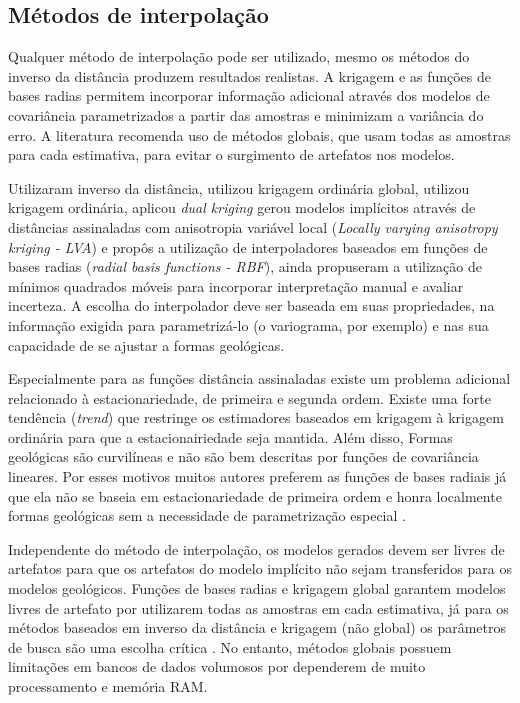 \subsection{Métodos de interpolação}\label{met_int}

Qualquer método de interpolação pode ser utilizado, mesmo os métodos do inverso da distância produzem resultados realistas. A krigagem e as funções de bases radias permitem incorporar informação adicional através dos modelos de covariância parametrizados a partir das amostras e minimizam a variância do erro. A literatura recomenda uso de métodos globais, que usam todas as amostras para cada estimativa, para evitar o surgimento de artefatos nos modelos.

 Utilizaram inverso da distância,  utilizou krigagem ordinária global,  utilizou krigagem ordinária,  aplicou \textit{dual kriging}  gerou modelos implícitos através de distâncias assinaladas com anisotropia variável local (\textit{Locally varying anisotropy kriging - LVA}) e  propôs a utilização de interpoladores baseados em funções de bases radias (\textit{radial basis functions - RBF}),  ainda propuseram a utilização de mínimos quadrados móveis para incorporar interpretação manual e avaliar incerteza. A escolha do interpolador deve ser baseada em suas propriedades, na informação exigida para parametrizá-lo (o variograma, por exemplo) e nas sua capacidade de se ajustar a formas geológicas.

Especialmente para as funções distância assinaladas existe um problema adicional relacionado à estacionariedade, de primeira e segunda ordem. Existe uma forte tendência (\textit{trend}) que restringe os estimadores baseados em krigagem à krigagem ordinária para que a estacionairiedade seja mantida. Além disso, Formas geológicas são curvilíneas e não são bem descritas por funções de covariância lineares. Por esses motivos muitos autores preferem as funções de bases radiais já que ela não se baseia em estacionariedade de primeira ordem e honra localmente formas geológicas sem a necessidade de parametrização especial \cite{martin2017implicitmodeling}.

Independente do método de interpolação, os modelos gerados devem ser livres de artefatos para que os artefatos do modelo implícito não sejam transferidos para os modelos geológicos. Funções de bases radias e krigagem global garantem modelos livres de artefato por utilizarem todas as amostras em cada estimativa, já para os métodos baseados em inverso da distância e krigagem (não global) os parâmetros de busca são uma escolha crítica \cite{martin2017implicitmodeling}. No entanto, métodos globais possuem limitações em bancos de dados volumosos por dependerem de muito processamento e memória RAM.

